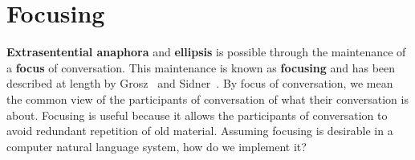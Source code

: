 \documentclass{article}
\begin{document}
\bigbreak
\begin{minipage}{\textwidth}
\end{minipage}
\bigbreak

\bigbreak
\begin{minipage}{\textwidth}
\end{minipage}
\bigbreak

%
%

\section{Focusing}

\textbf{Extrasentential anaphora} and \textbf{ellipsis} is
possible through the maintenance of a \textbf{focus} of
conversation. This maintenance is known as \textbf{focusing} and
has been described at length by Grosz~\cite{Grosz77} and
Sidner~\cite{Sidner79}. By focus of conversation, we mean the
common view of the participants of conversation of what their
conversation is about.  Focusing is useful because it allows the
participants of conversation to avoid redundant repetition of
old material.  Assuming focusing is desirable in a computer
natural language system, how do we implement it?
\end{document}
